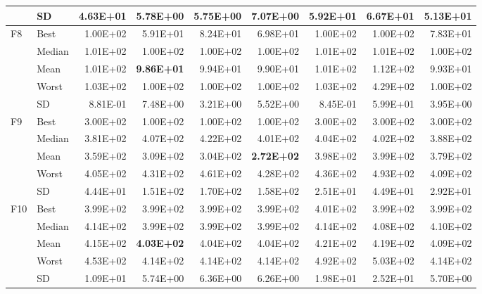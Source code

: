 \documentclass[algorithms,article,submit,moreauthors,pdftex]{Definitions/mdpi}
\newcommand{\bestval}[1]{\textbf{#1}}
\begin{document}
\begin{table}[p]
{\begin{tabular}{llrrrrrrr}
 & SD & 4.63E+01 & 5.78E+00 & 5.75E+00 & 7.07E+00 & 5.92E+01 & 6.67E+01 & 5.13E+01 \\
\midrule
F8 & Best & 1.00E+02 & 5.91E+01 & 8.24E+01 & 6.98E+01 & 1.00E+02 & 1.00E+02 & 7.83E+01 \\
 & Median & 1.01E+02 & 1.00E+02 & 1.00E+02 & 1.00E+02 & 1.01E+02 & 1.01E+02 & 1.00E+02 \\
 & Mean & 1.01E+02 & \bestval{9.86E+01} & 9.94E+01 & 9.90E+01 & 1.01E+02 & 1.12E+02 & 9.93E+01 \\
 & Worst & 1.03E+02 & 1.00E+02 & 1.00E+02 & 1.00E+02 & 1.03E+02 & 4.29E+02 & 1.00E+02 \\
 & SD & 8.81E-01 & 7.48E+00 & 3.21E+00 & 5.52E+00 & 8.45E-01 & 5.99E+01 & 3.95E+00 \\
\midrule
F9 & Best & 3.00E+02 & 1.00E+02 & 1.00E+02 & 1.00E+02 & 3.00E+02 & 3.00E+02 & 3.00E+02 \\
 & Median & 3.81E+02 & 4.07E+02 & 4.22E+02 & 4.01E+02 & 4.04E+02 & 4.02E+02 & 3.88E+02 \\
 & Mean & 3.59E+02 & 3.09E+02 & 3.04E+02 & \bestval{2.72E+02} & 3.98E+02 & 3.99E+02 & 3.79E+02 \\
 & Worst & 4.05E+02 & 4.31E+02 & 4.61E+02 & 4.28E+02 & 4.36E+02 & 4.93E+02 & 4.09E+02 \\
 & SD & 4.44E+01 & 1.51E+02 & 1.70E+02 & 1.58E+02 & 2.51E+01 & 4.49E+01 & 2.92E+01 \\
\midrule
F10 & Best & 3.99E+02 & 3.99E+02 & 3.99E+02 & 3.99E+02 & 4.01E+02 & 3.99E+02 & 3.99E+02 \\
 & Median & 4.14E+02 & 3.99E+02 & 3.99E+02 & 3.99E+02 & 4.14E+02 & 4.08E+02 & 4.10E+02 \\
 & Mean & 4.15E+02 & \bestval{4.03E+02} & 4.04E+02 & 4.04E+02 & 4.21E+02 & 4.19E+02 & 4.09E+02 \\
 & Worst & 4.53E+02 & 4.14E+02 & 4.14E+02 & 4.14E+02 & 4.92E+02 & 5.03E+02 & 4.14E+02 \\
 & SD & 1.09E+01 & 5.74E+00 & 6.36E+00 & 6.26E+00 & 1.98E+01 & 2.52E+01 & 5.70E+00 \\
\bottomrule
\end{tabular}}
\end{table}


\end{document}
